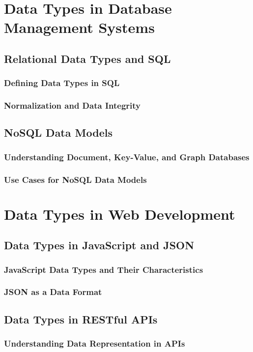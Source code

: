 \documentclass[12pt, oneside]{book}
\begin{document}
\section{Data Types in Database Management Systems}
\subsection{Relational Data Types and SQL}
\subsubsection{Defining Data Types in SQL}
\subsubsection{Normalization and Data Integrity}
\subsection{NoSQL Data Models}
\subsubsection{Understanding Document, Key-Value, and Graph Databases}
\subsubsection{Use Cases for NoSQL Data Models}
\section{Data Types in Web Development}
\subsection{Data Types in JavaScript and JSON}
\subsubsection{JavaScript Data Types and Their Characteristics}
\subsubsection{JSON as a Data Format}
\subsection{Data Types in RESTful APIs}
\subsubsection{Understanding Data Representation in APIs}
\end{document}
